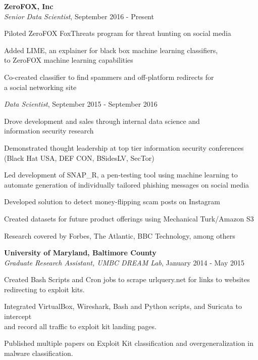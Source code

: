 \medskip
\atab \textbf{ZeroFOX, Inc}\\
\btab \textit{Senior Data Scientist}, September 2016 - Present\\
\begin{my_list}
\item Piloted ZeroFOX FoxThreats program for threat hunting on social media
\item Added LIME, an explainer for black box machine learning classifiers,\\ \tab \tab to ZeroFOX machine learning capabilities
\item Co-created classifier to find spammers and off-platform redirects for\\ \tab \tab a social networking site
\end{my_list}
\btab \textit{Data Scientist}, September 2015 - September 2016\\
\begin{my_list}
\item Drove development and sales through internal data science and\\ \tab \tab information security research
\item Demonstrated thought leadership at top tier information security conferences\\ \tab \tab (Black Hat USA, DEF CON, BSidesLV, SecTor)
\item Led development of SNAP\_R, a pen-testing tool using machine learning to\\ \tab \tab automate generation of individually tailored phishing messages on social media
\item Developed solution to detect money-flipping scam posts on Instagram
\item Created datasets for future product offerings using Mechanical Turk/Amazon S3 
\item Research covered by Forbes, The Atlantic, BBC Technology, among others
\end{my_list}

\medskip
\atab \textbf{University of Maryland, Baltimore County}\\
\btab \textit{Graduate Research Assistant, UMBC DREAM Lab}, January 2014 - May 2015\\
\begin{my_list}
\item Created Bash Scripts and Cron jobs to scrape urlquery.net for links to websites\\ \tab \tab redirecting to exploit kits.
\item Integrated VirtualBox, Wireshark, Bash and Python scripts, and Suricata to intercept\\ \tab \tab and record all traffic to exploit kit landing pages.
\item Published multiple papers on Exploit Kit classification and overgeneralization in\\ \tab \tab malware classification.
\end{my_list}

